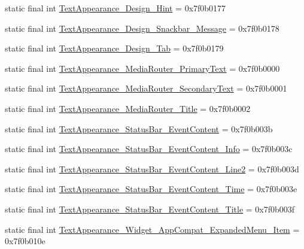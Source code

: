 \begin{CompactItemize}
\item 
static final int \hyperlink{classandroid_1_1support_1_1v4_1_1_r_1_1style_fa175ba43836149e0880cfcd6a7e4871}{TextAppearance\_\-Design\_\-Hint} = 0x7f0b0177
\item 
static final int \hyperlink{classandroid_1_1support_1_1v4_1_1_r_1_1style_fd17961ee4504ddd86e534396747f0ba}{TextAppearance\_\-Design\_\-Snackbar\_\-Message} = 0x7f0b0178
\item 
static final int \hyperlink{classandroid_1_1support_1_1v4_1_1_r_1_1style_651346df5c824077c341256b0b5e59b1}{TextAppearance\_\-Design\_\-Tab} = 0x7f0b0179
\item 
static final int \hyperlink{classandroid_1_1support_1_1v4_1_1_r_1_1style_99c7a57159659883644efe3309f27452}{TextAppearance\_\-MediaRouter\_\-PrimaryText} = 0x7f0b0000
\item 
static final int \hyperlink{classandroid_1_1support_1_1v4_1_1_r_1_1style_5b7e66a55c9b517b18c0f4b4ba16892b}{TextAppearance\_\-MediaRouter\_\-SecondaryText} = 0x7f0b0001
\item 
static final int \hyperlink{classandroid_1_1support_1_1v4_1_1_r_1_1style_b91bd059113684ce07d75cabb3d85c50}{TextAppearance\_\-MediaRouter\_\-Title} = 0x7f0b0002
\item 
static final int \hyperlink{classandroid_1_1support_1_1v4_1_1_r_1_1style_c4c6a6123689e9eb87aa7542bcfd1cb7}{TextAppearance\_\-StatusBar\_\-EventContent} = 0x7f0b003b
\item 
static final int \hyperlink{classandroid_1_1support_1_1v4_1_1_r_1_1style_b315098f9c5edb0b55ae1cb2d1e6b927}{TextAppearance\_\-StatusBar\_\-EventContent\_\-Info} = 0x7f0b003c
\item 
static final int \hyperlink{classandroid_1_1support_1_1v4_1_1_r_1_1style_3770350cea2b61da376e57c50f2cc2a8}{TextAppearance\_\-StatusBar\_\-EventContent\_\-Line2} = 0x7f0b003d
\item 
static final int \hyperlink{classandroid_1_1support_1_1v4_1_1_r_1_1style_6c960c22251389d218ffc2b4780765c0}{TextAppearance\_\-StatusBar\_\-EventContent\_\-Time} = 0x7f0b003e
\item 
static final int \hyperlink{classandroid_1_1support_1_1v4_1_1_r_1_1style_b6a47801ccf8aaafefdfc546dc446638}{TextAppearance\_\-StatusBar\_\-EventContent\_\-Title} = 0x7f0b003f
\item 
static final int \hyperlink{classandroid_1_1support_1_1v4_1_1_r_1_1style_d066adf3b0faec8c1996ca21a306b10a}{TextAppearance\_\-Widget\_\-AppCompat\_\-ExpandedMenu\_\-Item} = 0x7f0b010e
\item 

\end{CompactItemize}
